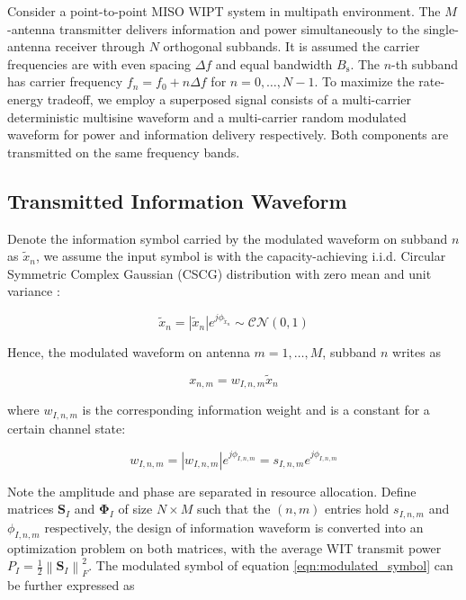 Consider a point-to-point MISO WIPT system in multipath environment. The $M$-antenna transmitter delivers information and power simultaneously to the single-antenna receiver through $N$ orthogonal subbands. It is assumed the carrier frequencies are with even spacing $\Delta f$ and equal bandwidth ${B_{\text{s}}}$. The $n$-th subband has carrier frequency ${f_n} = {f_0} + n\Delta f$ for $n = 0, \ldots ,N - 1$. To maximize the rate-energy tradeoff, we employ a superposed signal consists of a multi-carrier deterministic multisine waveform and a multi-carrier random modulated waveform for power and information delivery respectively. Both components are transmitted on the same frequency bands.



\subsection{Transmitted Information Waveform}\label{sec:transmitted-information-waveform}
Denote the information symbol carried by the modulated waveform on subband $n$ as ${{\tilde x}_n}$, we assume the input symbol is with the capacity-achieving i.i.d. Circular Symmetric Complex Gaussian (CSCG) distribution with zero mean and unit variance \cite{Varasteh2017a}:

\begin{equation}\label{eqn:unmodulated_symbol}
  {{\tilde x}_n} = \left| {{{\tilde x}_n}} \right|{e^{j{\phi _{{{\tilde x}_n}}}}}\sim\mathcal{C}\mathcal{N}(0,1)
\end{equation}

Hence, the modulated waveform on antenna $m = 1, \ldots ,M$, subband $n$ writes as

\begin{equation}\label{eqn:modulated_symbol}
  {x_{n,m}} = {w_{I,n,m}}{{\tilde x}_n}
\end{equation}

where ${w_{I,n,m}}$ is the corresponding information weight and is a constant for a certain channel state:

\begin{equation}\label{eqn:weight_information}
  {w_{I,n,m}} = \left| {{w_{I,n,m}}} \right|{e^{j{\phi _{I,n,m}}}} = {s_{I,n,m}}{e^{j{\phi _{I,n,m}}}}
\end{equation}

Note the amplitude and phase are separated in resource allocation. Define matrices ${{\mathbf{S}}_I}$ and ${{\mathbf{\Phi }}_I}$ of size $N \times M$ such that the $(n,m)$ entries hold ${s_{I,n,m}}$ and ${\phi _{I,n,m}}$ respectively, the design of information waveform is converted into an optimization problem on both matrices, with the average WIT transmit power ${P_I} = \frac{1}{2}\left\| {{{\mathbf{S}}_I}} \right\|_F^2$. The modulated symbol of equation \ref{eqn:modulated_symbol} can be further expressed as

